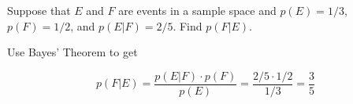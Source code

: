 \documentclass[../main.tex]{subfiles}
\begin{document}
Suppose that $E$ and $F$ are events in a sample space and $p(E) = 1/3$, $p(F) = 1/2$, and $p(E|F) = 2/5$. Find $p(F|E)$.

\solution

Use Bayes' Theorem to get

\[ p(F|E) = \frac{p(E|F)\cdot p(F)}{p(E)} = \frac{2/5 \cdot 1/2}{1/3} = \frac{3}{5} \]
\end{document}
